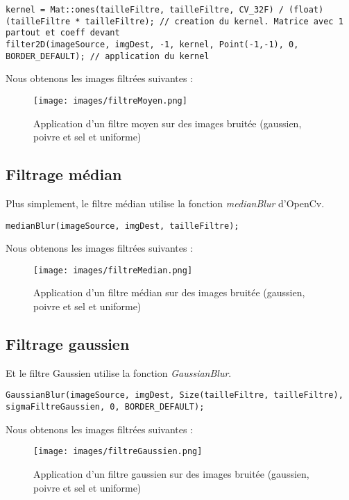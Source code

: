 \documentclass{article}
\begin{document}
 \begin{lstlisting}
kernel = Mat::ones(tailleFiltre, tailleFiltre, CV_32F) / (float)(tailleFiltre * tailleFiltre); // creation du kernel. Matrice avec 1 partout et coeff devant
filter2D(imageSource, imgDest, -1, kernel, Point(-1,-1), 0, BORDER_DEFAULT); // application du kernel
 \end{lstlisting}

 Nous obtenons les images filtrées suivantes :

\begin{figure}[h!]
   \centering
   \caption{Application d'un filtre moyen sur des images bruitée (gaussien, poivre et sel et uniforme)}
   \texttt{[image: images/filtreMoyen.png]}
\end{figure}


 \subsection{Filtrage médian}
 Plus simplement, le filtre médian utilise la fonction \emph{medianBlur} d'OpenCv.\\

 \begin{lstlisting}
medianBlur(imageSource, imgDest, tailleFiltre);
 \end{lstlisting}

 Nous obtenons les images filtrées suivantes :

\begin{figure}[h!]
   \centering
   \caption{Application d'un filtre médian sur des images bruitée (gaussien, poivre et sel et uniforme)}
   \texttt{[image: images/filtreMedian.png]}
\end{figure}

 \subsection{Filtrage gaussien}
 Et le filtre Gaussien utilise la fonction \emph{GaussianBlur}.

\begin{lstlisting}
GaussianBlur(imageSource, imgDest, Size(tailleFiltre, tailleFiltre), sigmaFiltreGaussien, 0, BORDER_DEFAULT);
 \end{lstlisting} 

 Nous obtenons les images filtrées suivantes :

\begin{figure}[h!]
   \centering
   \caption{Application d'un filtre gaussien sur des images bruitée (gaussien, poivre et sel et uniforme)}
   \texttt{[image: images/filtreGaussien.png]}
\end{figure}
\end{document}
